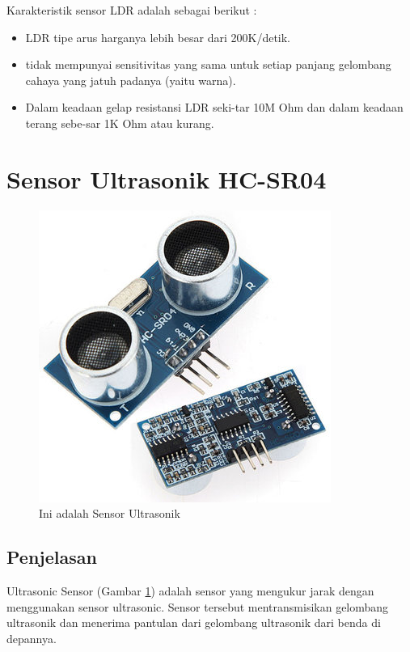 Karakteristik sensor LDR adalah sebagai berikut :

\begin{itemize}
	\item LDR tipe arus harganya lebih besar dari 200K/detik.
	\item tidak mempunyai sensitivitas yang sama untuk setiap panjang gelombang cahaya yang jatuh padanya (yaitu warna).
	\item Dalam keadaan gelap resistansi LDR seki-tar 10M Ohm dan dalam keadaan terang sebe-sar 1K Ohm atau kurang.

\end{itemize}

\section{Sensor Ultrasonik HC-SR04}
\begin{figure}[!htbp]
  \centering
  \includegraphics[width=.75\textwidth]{figures/Arduino/sensor.jpg}
  \caption{Ini adalah Sensor Ultrasonik}\label{fig:ultra}
\end{figure}

\subsection{Penjelasan}
Ultrasonic Sensor (Gambar \ref{fig:ultra}) adalah sensor yang mengukur jarak dengan menggunakan sensor ultrasonic. Sensor tersebut mentransmisikan gelombang ultrasonik dan menerima pantulan dari gelombang ultrasonik dari benda di depannya. 

